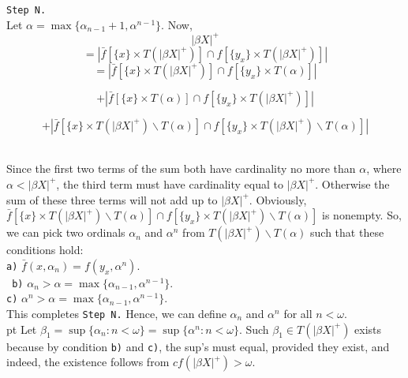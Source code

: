 \documentclass{article}
\begin{document}
																												    \texttt{Step N.}\\ Let $\alpha=\max\{\alpha_{n-1}+1,\alpha^{n-1}\}.$ Now,  \vskip 10pt    
																												    $$|\beta X|^+ $$
																												    $$= \left| \bar{f}\left[\{x\}\times T(|\beta X|^+)\right] \cap f\left[\{y_x\} \times T(|\beta X |^+)\right]\right|$$
																												    $$=\left| \bar{f}\left[\{x\}\times T(|\beta X|^+)\right] \cap f\left[\{y_x\} \times T(\alpha)\right]\right|$$

																												    $$+\left| \bar{f}\left[\{x\}\times T(\alpha)\right] \cap f\left[\{y_x\} \times T(|\beta X |^+)\right]\right|$$

																												    $$+\left| \bar{f}\left[\{x\}\times T(|\beta X|^+)\backslash T(\alpha)\right] \cap f\left[\{y_x\} \times T(|\beta X |^+)\backslash T(\alpha)\right]\right|$$\\

																												    \vskip 10pt

																												    Since the first two terms of the sum both have cardinality no more than $\alpha$, where $\alpha <|\beta X|^+$, the third term must have cardinality equal to $|\beta X|^+$. Otherwise the sum of these three terms will not add up to $|\beta X|^+$. Obviously, $\bar{f}[\{x\}\times T(|\beta X|^+)\backslash T(\alpha)] \cap f[\{y_x\} \times T(|\beta X |^+)\backslash T(\alpha)] $ is nonempty. So, we can pick two ordinals $\alpha_n$ and $\alpha^n$ from $T(|\beta X|^+)\backslash T(\alpha)$ such that these conditions hold: \\
																													\texttt{a)} $\bar{f}(x,\alpha_n)=f(y_x,\alpha^n)$.	\\	
																													\texttt{	b)} $\alpha_n> \alpha= \max\{\alpha_{n-1}, \alpha^{n-1}\}$.\\	
																													\texttt{c)} $\alpha^n> \alpha= \max\{\alpha_{n-1}, \alpha^{n-1}\}$.\\

																													This completes \texttt{Step N.} Hence, we can define $\alpha_n$ and $\alpha^n$ for all $n<\omega$.\\
																													     pt
																													    Let $\beta_1=\sup\{\alpha_n:n<\omega\}=\sup\{\alpha^n: n<\omega \}.$ Such $\beta_1\in T(|\beta X|^+)$ exists because by condition \texttt{b)} and \texttt{c)}, the sup's must equal, provided they exist, and indeed, the existence follows from $cf(|\beta X|^+) > \omega$. 
\end{document}
